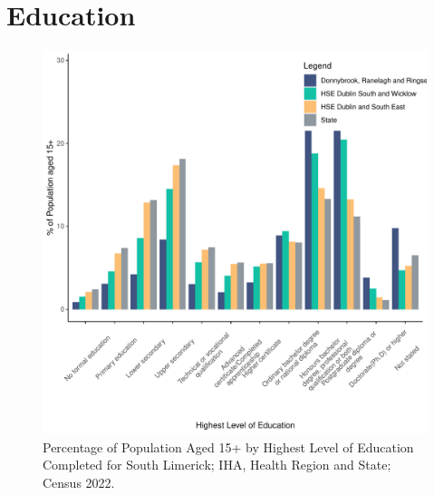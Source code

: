 \documentclass{article}
\begin{document}
\section{Education}\label{sect:Edu}
\begin{figure}[H]
	\centering
	\includegraphics[width = 120mm]{../figures/EduED.pdf}
	\caption{Percentage of Population Aged 15+ by Highest Level of Education Completed for South Limerick; IHA, Health Region and State; Census 2022.}
	\label{fig:vbnv}
	\end{figure}
\end{document}

